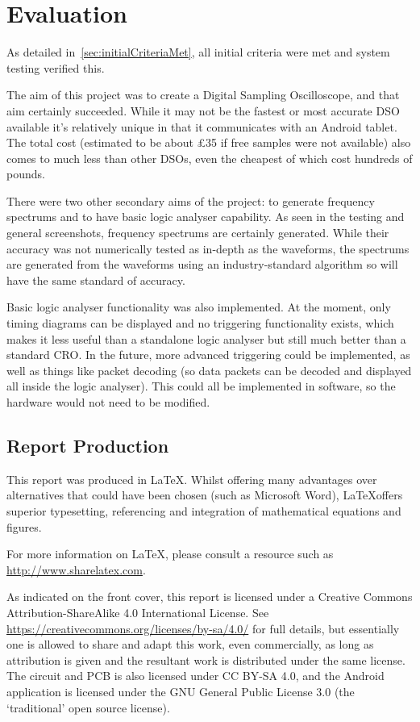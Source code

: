 \chapter{Evaluation}

As detailed in~\cref{sec:initialCriteriaMet}, all initial criteria were met and
system testing verified this.

The aim of this project was to create a Digital Sampling Oscilloscope, and that
aim certainly succeeded. While it may not be the fastest or most accurate DSO
available it's relatively unique in that it communicates with an Android tablet.
The total cost (estimated to be about \pounds 35 if free samples were not
available) also comes to much less than other DSOs, even the cheapest of which
cost hundreds of pounds.

There were two other secondary aims of the project: to generate frequency
spectrums and to have basic logic analyser capability. As seen in the testing
and general screenshots, frequency spectrums are certainly generated. While
their accuracy was not numerically tested as in-depth as the waveforms, the
spectrums are generated from the waveforms using an industry-standard algorithm
so will have the same standard of accuracy.

Basic logic analyser functionality was also implemented. At the moment, only
timing diagrams can be displayed and no triggering functionality exists, which
makes it less useful than a standalone logic analyser but still much better than
a standard CRO. In the future, more advanced triggering could be implemented, as
well as things like packet decoding (so data packets can be decoded and
displayed all inside the logic analyser). This could all be implemented in
software, so the hardware would not need to be modified.

\section{Report Production}

This report was produced in \LaTeX. Whilst offering many advantages over
alternatives that could have been chosen (such as Microsoft Word), \LaTeX offers
superior typesetting, referencing and integration of mathematical equations and
figures.

For more information on \LaTeX, please consult a resource such as
\url{http://www.sharelatex.com}.

As indicated on the front cover, this report is licensed under a Creative
Commons Attribution-ShareAlike 4.0 International License. See
\url{https://creativecommons.org/licenses/by-sa/4.0/} for full details, but
essentially one is allowed to share and adapt this work, even commercially, as
long as attribution is given and the resultant work is distributed under the
same license. The circuit and PCB is also licensed under CC BY-SA 4.0, and the
Android application is licensed under the GNU General Public License 3.0 (the
`traditional' open source license).
